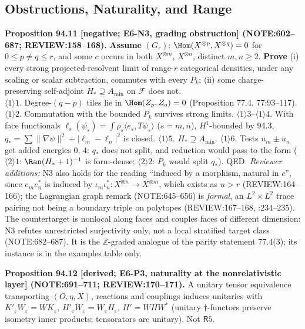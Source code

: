 \subsection{Obstructions, Naturality, and Range}

\textbf{Proposition 94.11 [negative; E6-N3, grading obstruction] (NOTE:602--687; REVIEW:158--168).}  \textbf{Assume} \((G_r)\):
\(\Hom(X^{\otimes p},X^{\otimes q})=0\) for \(0\le p\neq q\le r\), and some \(c\) occurs in both \(X^{\otimes m}\), \(X^{\otimes n}\), distinct \(m,n\ge2\).
\textbf{Prove} (i) every strong projected-resolvent limit of range-\(r\) categorical densities, under any scaling or scalar
subtraction, commutes with every \(P_k\); (ii) some charge-preserving self-adjoint \(H_*\supseteq A_{\min}\) on \(\mathcal F\) does not.\\
\(\langle1\rangle1\). Degree-\((q{-}p)\) tiles lie in \(\Hom(Z_p,Z_q)=0\) (Proposition 77.4, 77:93--117).  \(\langle1\rangle2\). Commutation with the
bounded \(P_k\) survives strong limits.  \(\langle1\rangle3\)--\(\langle1\rangle4\). With face functionals \(\ell_s(\psi_s)=\int\rho_s\langle e_s,T\psi_s\rangle\)
(\(s=m,n\)), \(H^1\)-bounded by 94.3, \(q_*=\sum\|\nabla\psi\|^2+|\ell_m-\ell_n|^2\) is closed.  \(\langle1\rangle5\). \(H_*\supseteq A_{\min}\).  \(\langle1\rangle6\).
Tests \(u_m\pm u_n\) get added energies \(0\), \(4\): \(q_*\) does not split, and reduction would pass to the form (\(\langle2\rangle1\):
\(\Ran(H_*+1)^{-1}\) is form-dense; \(\langle2\rangle2\): \(P_k\) would split \(q_*\)).  QED.  \emph{Reviewer additions:} N3 also holds for
the reading ``induced by a morphism, natural in \(c\)'', since \(e_me_n^*\) is induced by \(\iota_m\iota_n^*:X^{\otimes n}\to X^{\otimes m}\), which
exists as \(n>r\) (REVIEW:164--166); the Lagrangian graph remark (NOTE:645--656) is \emph{formal}, an \(L^2\times L^2\) trace pairing
not being a boundary triple on polytopes (REVIEW:167--168, :234--235).  The countertarget is nonlocal along faces and couples
faces of different dimension: N3 refutes unrestricted surjectivity only, not a local stratified target class (NOTE:682--687).
It is the \(\mathbb Z\)-graded analogue of the parity statement 77.4(3); its instance is in the examples table only.

\textbf{Proposition 94.12 [derived; E6-P3, naturality at the nonrelativistic layer] (NOTE:691--711; REVIEW:170--171).}  A
unitary tensor equivalence transporting \((O,\eta,X)\), reactions and couplings induces unitaries with \(K'_\varepsilon W_\varepsilon=WK_\varepsilon\),
\(H'_\varepsilon W_\varepsilon=W_\varepsilon H_\varepsilon\), \(H'=WHW^*\) (unitary \(\dagger\)-functors preserve isometry inner products; tensorators are unitary).  Not \(\mathsf R5\).

